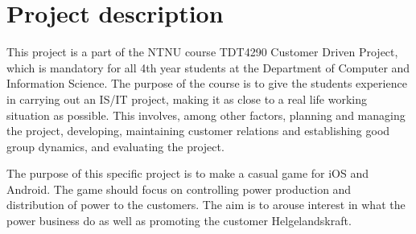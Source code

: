 \section{Project description}

This project is a part of the NTNU course TDT4290 Customer Driven Project, which is mandatory for all 4th year students at the Department of Computer and Information Science. The purpose of the course is to give the students experience in carrying out an IS/IT project, making it as close to a real life working situation as possible. This involves, among other factors, planning and managing the project, developing, maintaining customer relations and establishing good group dynamics, and evaluating the project.


The purpose of this specific project is to make a casual game for iOS and Android. The game should focus on controlling power production and distribution of power to the customers. The aim is to arouse interest in what the power business do as well as promoting the customer Helgelandskraft.

